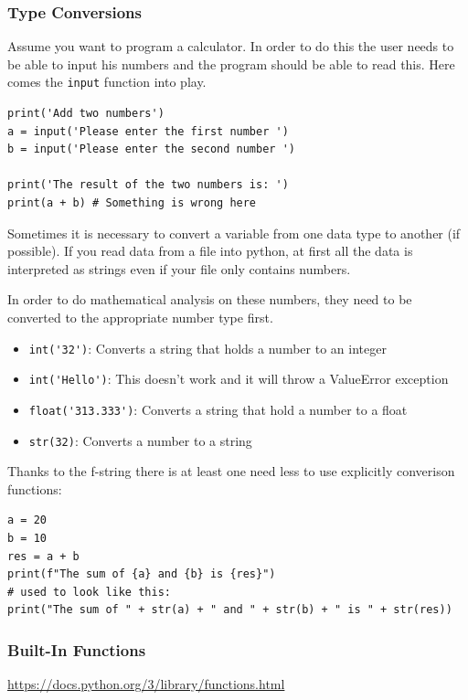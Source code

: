 \documentclass[10pt, a4paper]{beamer} %
\begin{document}
\begin{frame}
  \frametitle{Type Conversions}

  Assume you want to program a calculator.
  In order to do this the user needs to be able to input his numbers and the program should be able to read this.
  Here comes the \lstinline!input! function into play.

  \begin{lstlisting}
print('Add two numbers')
a = input('Please enter the first number ')
b = input('Please enter the second number ')

print('The result of the two numbers is: ')
print(a + b) # Something is wrong here
\end{lstlisting}


  \framebreak
  Sometimes it is necessary to convert a variable from one data type to another (if possible). If you
  read data from a file into python, at first all the data is interpreted as strings even if your file only
  contains numbers.

  In order to do mathematical analysis on these numbers, they need to be converted to the appropriate number type first.

  \begin{itemize}
    \item \lstinline!int('32')!: Converts a string that holds a number to an integer
    \item \lstinline!int('Hello')!: This doesn't work and it will throw a ValueError exception
    \item \lstinline!float('313.333')!: Converts a string that hold a number to a float
    \item \lstinline!str(32)!: Converts a number to a string
  \end{itemize}

  Thanks to the f-string there is at least one need less to use explicitly converison functions:
  \begin{examples}
    \begin{lstlisting}
a = 20
b = 10
res = a + b
print(f"The sum of {a} and {b} is {res}")
# used to look like this:
print("The sum of " + str(a) + " and " + str(b) + " is " + str(res))
\end{lstlisting}
  \end{examples}
\end{frame}

\begin{frame}[c]\frametitle{Built-In Functions}
  \url{https://docs.python.org/3/library/functions.html}
\end{frame}
\end{document}
